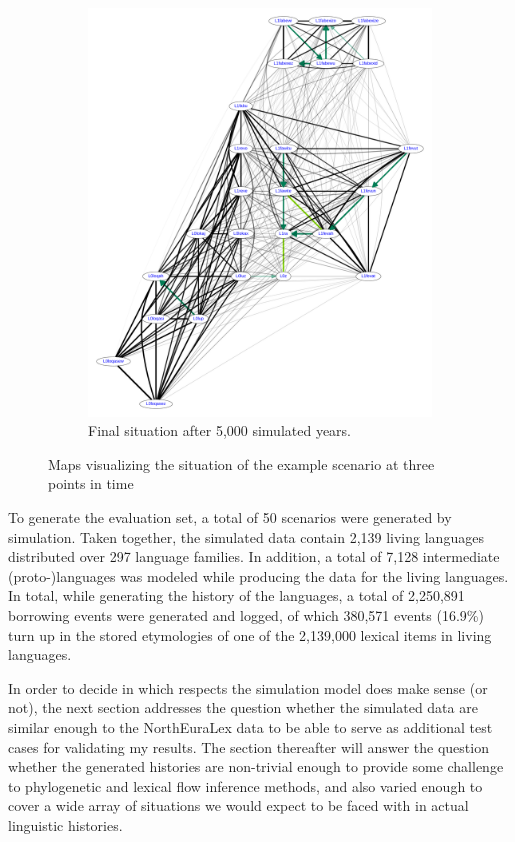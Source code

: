 \begin{figure}
%
\begin{subfigure}{0.4\hsize}
 \centering
 \includegraphics[scale=0.15]{figures/sim-example-present-map.pdf}
 \caption{Final situation after 5,000 simulated years.}
 \label{simulated-map-present}
\end{subfigure}
 \caption{Maps visualizing the situation of the example scenario at three points in time}
 \label{simulated-maps}
\end{figure}

To generate the evaluation set, a total of 50 scenarios were generated by simulation. Taken together, the simulated data contain 2,139 living languages distributed over 297 language families. In addition, a total of 7,128 intermediate (proto-)languages was modeled while producing the data for the living languages. In total, while generating the history of the languages, a total of 2,250,891 borrowing events were generated and logged, of which 380,571 events (16.9\%) turn up in the stored etymologies of one of the 2,139,000 lexical items in living languages.

In order to decide in which respects the simulation model does make sense (or not), the next section addresses the question whether the simulated data are similar enough to the NorthEuraLex data to be able to serve as additional test cases for validating my results. The section thereafter will answer the question whether the generated histories are non-trivial enough to provide some challenge to phylogenetic and lexical flow inference methods, and also varied enough to cover a wide array of situations we would expect to be faced with in actual linguistic histories.

